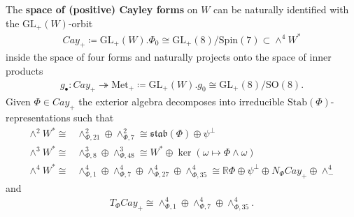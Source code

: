 \documentclass[psamsfonts]{amsart}
\theoremstyle{plain}
\theoremstyle{definition}{
\newtheorem{defi}{Definition}[section]
\newtheorem{ass}{Assumption}
\newtheorem*{nota}{Notation}}
\theoremstyle{remark}{
\newtheorem{rem}{Remark}
\newtheorem{ex}{Example}}
\theoremstyle{plain}{
\newtheorem{thm}{Theorem}[section]
\newtheorem{lem}{Lemma}[section]
\newtheorem{cor}{Corollary}[section]
\newtheorem{prop}{Proposition}[section]
\newtheorem{con}{Conjecture}[section]}
\newcommand{\m}[1]{{\mathrm{#1}}}
\begin{document}
The \textbf{space of (positive) Cayley forms} on $W$ can be naturally identified with the $\m{GL}_+(W)$-orbit 
\begin{align*}
    Cay_+\coloneqq \m{GL}_+(W).\Phi_0\cong \m{GL}_+(8)/\m{Spin}(7)\subset \wedge^4 W^*
\end{align*}
inside the space of four forms and naturally projects onto the space of inner products 
\begin{align*}
    g_\bullet \colon Cay_+\twoheadrightarrow \m{Met}_+\coloneqq \m{GL}_+(W).g_0\cong \m{GL}_+(8)/\m{SO}(8).
\end{align*}
Given $\Phi\in Cay_+$ the exterior algebra decomposes into irreducible $\m{Stab}(\Phi)$-representations such that 
\begin{align*}
    \wedge^2W^*\cong& \wedge^2_{\Phi,21}\oplus \wedge^2_{\Phi,7}\cong \mathfrak{stab}(\Phi)\oplus \psi^{\perp}\\
    \wedge^3W^*\cong& \wedge^3_{\Phi,8}\oplus \wedge^3_{\Phi,48}\cong W^*\oplus \ker(\omega\mapsto \Phi\wedge \omega)\\
    \wedge^4 W^*\cong &\wedge^4_{\Phi,1}\oplus \wedge^{4}_{\Phi,7}\oplus \wedge^4_{\Phi,27}\oplus \wedge^4_{\Phi,35}\cong \mathbb{R}\Phi\oplus \psi^\perp\oplus N_\Phi Cay_+\oplus \wedge^4_-
\end{align*}
and 
\begin{align*}
    T_\Phi Cay_+\cong \wedge^4_{\Phi,1}\oplus \wedge^4_{\Phi,7}\oplus  \wedge^4_{\Phi,35}.
\end{align*}

\end{document}

